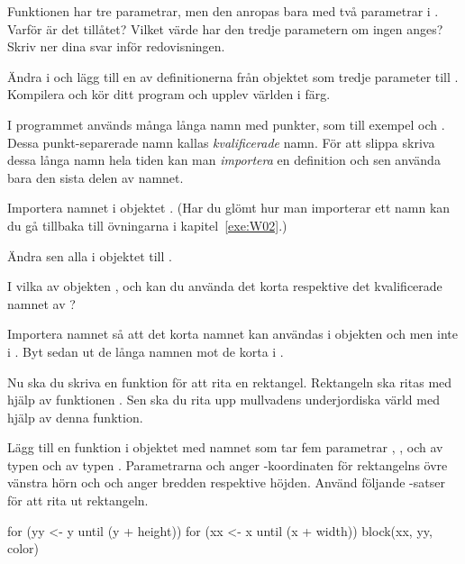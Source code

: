 \Subtask\Pen
Funktionen  har tre parametrar, men den anropas bara med två parametrar i .
Varför är det tillåtet?
Vilket värde har den tredje parametern om ingen anges?
Skriv ner dina svar inför redovisningen.


\Subtask
Ändra i  och lägg till en av definitionerna från objektet  som tredje parameter till .
Kompilera och kör ditt program och upplev världen i färg.

\Task
I programmet används många långa namn med punkter, som till exempel  och .
Dessa punkt-separerade namn kallas \emph{kvalificerade} namn.
För att slippa skriva dessa långa namn hela tiden kan man \emph{importera} en definition och sen använda bara den sista delen av namnet.

\Subtask
Importera namnet  i objektet . (Har du glömt hur man importerar ett namn kan du gå tillbaka till övningarna i kapitel~\ref{exe:W02}.)

\Subtask 
Ändra sen alla  i objektet till .

\Subtask\Pen
I vilka av objekten ,  och  kan du använda det korta respektive det kvalificerade namnet av ?

\Subtask
Importera namnet  så att det korta namnet  kan användas i objekten  och  men inte i .
Byt sedan ut de långa namnen mot de korta i .

\Task
Nu ska du skriva en funktion för att rita en rektangel. Rektangeln ska ritas med hjälp av funktionen .
Sen ska du rita upp mullvadens underjordiska värld med hjälp av denna funktion.

\Subtask
Lägg till en funktion i objektet  med namnet  som tar fem parametrar , ,  och  av typen  och  av typen .
Parametrarna  och  anger -koordinaten för rektangelns övre vänstra hörn och  och  anger bredden respektive höjden.
Använd följande -satser för att rita ut rektangeln.
\begin{Code}
for (yy <- y until (y + height)) {
	for (xx <- x until (x + width)) {
		block(xx, yy, color)
	}
}
\end{Code}

